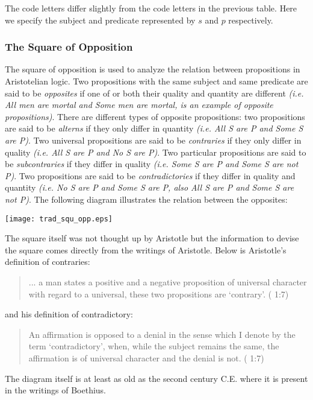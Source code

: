\documentclass[12pt]{article}
\begin{document}
The code letters differ slightly from the code letters in the previous table.  Here we specify the subject and predicate represented by $s$ and $p$ respectively. 

\subsubsection*{The Square of Opposition}
The square of opposition is used to analyze the relation between propositions in Aristotelian logic.  Two propositions with the same subject and same predicate are said to be \emph{opposites} if one of or both their quality and quantity are different \textit{(i.e. All men are mortal and Some men are mortal, is an example of opposite propositions)}.  There are different types of opposite propositions: two propositions are said to be \emph{alterns} if they only differ in quantity \textit{(i.e. All S are P and Some S are P)}.  Two universal propositions are said to be \emph{contraries} if they only differ in quality \textit{(i.e. All S are P and No S are P)}.  Two particular propositions are said to be \emph{subcontraries} if they differ in quality \textit{(i.e. Some S are P and Some S are not P)}.  Two propositions are said to be \emph{contradictories} if they differ in quality and quantity \textit{(i.e. No S are P and Some S are P, also All S are P and Some S are not P)}.  The following diagram illustrates the relation between the opposites:
\begin{center}
\texttt{[image: trad\_squ\_opp.eps]}
\end{center}
The square itself was not thought up by Aristotle but the information to devise the square comes directly from the writings of Aristotle.  Below is Aristotle's definition of contraries:
\begin{quote}
... a man states a positive and a negative proposition of universal character with regard to a universal, these two propositions are `contrary'. (\cite{AI} 1:7)
\end{quote}
and his definition of contradictory:
\begin{quote}
An affirmation is opposed to a denial in the sense which I denote by the term `contradictory', when, while the subject remains the same, the affirmation is of universal character and the denial is not. (\cite{AI} 1:7)
\end{quote}
The diagram itself is at least as old as the second century C.E. where it is present in the writings of Boethius.\cite{PT}
\end{document}
